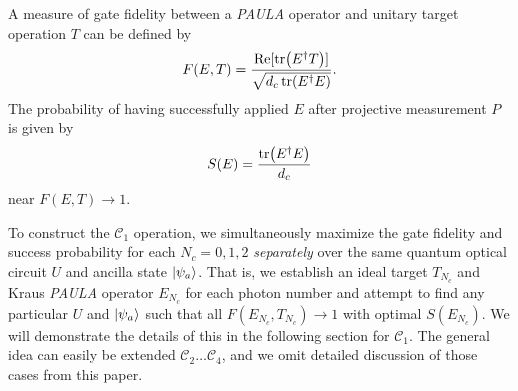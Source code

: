 \documentclass[aps,pra,twocolumn,showpacs,superscriptaddress,floatfix,10pt]{revtex4}
\begin{document}
A measure of gate fidelity between a \textit{PAULA} operator and unitary target operation $T$ can be defined by
\begin{equation}
\label{Gate Fidelity}
F(E,T) = \frac{\Re[\tr(E^\dagger T)]}{\sqrt{d_c \tr(E^\dagger E)} }.
\end{equation}
The probability of having successfully applied $E$ after projective measurement $P$ is given by
\begin{equation}
\label{Success Probability} 
S(E) = \frac{\tr(E^\dagger E)}{d_c}
\end{equation}
near $F(E,T) \rightarrow 1$.

To construct the $\mathcal{C}_1$ operation, we simultaneously maximize the gate fidelity and success probability for each  $N_c=0,1,2$ \textit{separately} over the same quantum optical circuit $U$ and ancilla state $\ket{\psi_a}$. That is, we establish an ideal target $T_{N_c}$ and Kraus \textit{PAULA} operator $E_{N_c}$ for each photon number and attempt to find any particular $U$ and $\ket{\psi_a}$ such that all $F(E_{N_c},T_{N_c}) \rightarrow 1$ with optimal $S(E_{N_c})$. We will demonstrate the details of this in the following section for $\mathcal{C}_1$. The general idea can easily be extended $\mathcal{C}_2 \dots \mathcal{C}_4$, and we omit detailed discussion of those cases from this paper.
\end{document}
